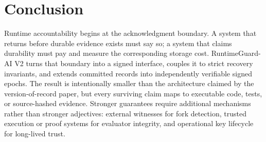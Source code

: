 \documentclass[10pt,twocolumn]{article}
\newcommand{\system}{RuntimeGuard-AI V2}
\begin{document}
\section{Conclusion}
Runtime accountability begins at the acknowledgment boundary. A system that returns before durable evidence exists must say so; a system that claims durability must pay and measure the corresponding storage cost. \system{} turns that boundary into a signed interface, couples it to strict recovery invariants, and extends committed records into independently verifiable signed epochs. The result is intentionally smaller than the architecture claimed by the version-of-record paper, but every surviving claim maps to executable code, tests, or source-hashed evidence. Stronger guarantees require additional mechanisms rather than stronger adjectives: external witnesses for fork detection, trusted execution or proof systems for evaluator integrity, and operational key lifecycle for long-lived trust.

\begingroup
\footnotesize


\endgroup
\end{document}
